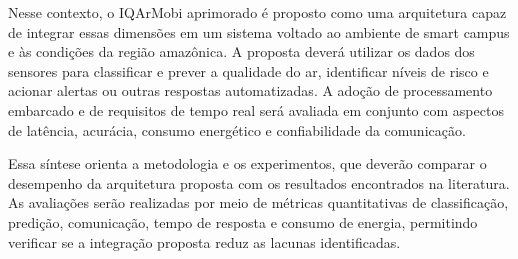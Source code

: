 \documentclass[12pt,a4paper]{article}
\begin{document}
Nesse contexto, o IQArMobi aprimorado é proposto como uma arquitetura capaz de
integrar essas dimensões em um sistema voltado ao ambiente de smart campus e às
condições da região amazônica. A proposta deverá utilizar os dados dos sensores
para classificar e prever a qualidade do ar, identificar níveis de risco e
acionar alertas ou outras respostas automatizadas. A adoção de processamento
embarcado e de requisitos de tempo real será avaliada em conjunto com aspectos
de latência, acurácia, consumo energético e confiabilidade da comunicação.

Essa síntese orienta a metodologia e os experimentos, que deverão comparar o
desempenho da arquitetura proposta com os resultados encontrados na literatura.
As avaliações serão realizadas por meio de métricas quantitativas de
classificação, predição, comunicação, tempo de resposta e consumo de energia,
permitindo verificar se a integração proposta reduz as lacunas identificadas.

\printbibliography
\end{document}

